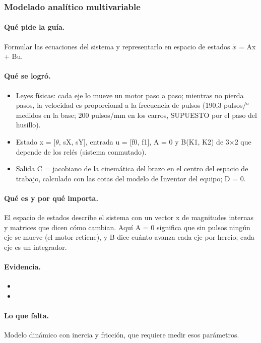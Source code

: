 \documentclass[a4paper,11pt]{article}
\begin{document}
\subsubsection{Modelado analítico multivariable}
\paragraph{Qué pide la guía.} Formular las ecuaciones del sistema y representarlo en espacio de estados $\dot{x}$ = Ax + Bu.
\paragraph{Qué se logró.}
\begin{itemize}
\item Leyes físicas: cada eje lo mueve un motor paso a paso; mientras no pierda pasos, la velocidad es proporcional a la frecuencia de pulsos (190,3 pulsos/° medidos en la base; 200 pulsos/mm en los carros, SUPUESTO por el paso del husillo).
\item Estado x = [$\theta$, sX, sY], entrada u = [f0, f1], A = 0 y B(K1, K2) de 3$\times$2 que depende de los relés (sistema conmutado).
\item Salida C = jacobiano de la cinemática del brazo en el centro del espacio de trabajo, calculado con las cotas del modelo de Inventor del equipo; D = 0.
\end{itemize}
\paragraph{Qué es y por qué importa.} El espacio de estados describe el sistema con un vector x de magnitudes internas y matrices que dicen cómo cambian. Aquí A = 0 significa que sin pulsos ningún eje se mueve (el motor retiene), y B dice cuánto avanza cada eje por hercio; cada eje es un integrador.
\paragraph{Evidencia.}
\begin{itemize}\small
\item {}
\item {}
\end{itemize}
\paragraph{Lo que falta.} Modelo dinámico con inercia y fricción, que requiere medir esos parámetros.
\end{document}
